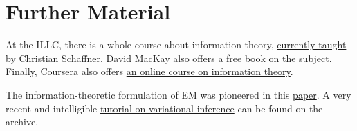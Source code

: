 \documentclass[11pt,leqno,a4paper]{report}\usepackage[]{graphicx}\usepackage[]{color}
\begin{document}



\section*{Further Material}

At the ILLC, there is a whole course about information theory, \href{http://homepages.cwi.nl/~schaffne/courses/inftheory/}{currently taught by Christian Schaffner}. David MacKay also offers \href{http://www.inference.phy.cam.ac.uk/itprnn/book.pdf}{a free book on the subject}. Finally,
Coursera also offers \href{https://www.coursera.org/course/informationtheory}{an online course on information theory}.

The information-theoretic formulation of EM was pioneered in this \href{http://www.cs.toronto.edu/~fritz/absps/emk.pdf}{paper}. A very recent and intelligible 
\href{https://arxiv.org/abs/1601.00670}{tutorial on variational inference} can be found on the archive.
\end{document}
